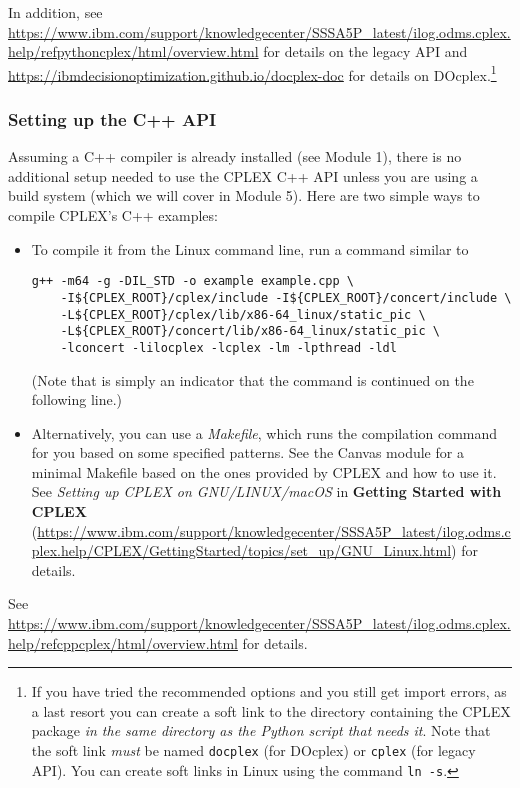 \documentclass[12pt]{article}
\begin{document}
In addition, see \url{https://www.ibm.com/support/knowledgecenter/SSSA5P_latest/ilog.odms.cplex.help/refpythoncplex/html/overview.html} for details on the legacy API and \url{https://ibmdecisionoptimization.github.io/docplex-doc} for details on DOcplex.\footnote{
    If you have tried the recommended options and you still get import errors, as a last resort you can create a soft link to the directory containing the CPLEX package \emph{in the same directory as the Python script that needs it}.
    Note that the soft link \emph{must} be named \texttt{docplex} (for DOcplex) or \texttt{cplex} (for legacy API).
    You can create soft links in Linux using the command \texttt{ln -s}.
}

\subsubsection{Setting up the C++ API}
Assuming a C++ compiler is already installed (see Module 1), there is no additional setup needed to use the CPLEX C++ API unless you are using a build system (which we will cover in Module 5).
Here are two simple ways to compile CPLEX's C++ examples:

\begin{itemize}
    \item To compile it from the Linux command line, run a command similar to
\begin{verbatim}
g++ -m64 -g -DIL_STD -o example example.cpp \
    -I${CPLEX_ROOT}/cplex/include -I${CPLEX_ROOT}/concert/include \
    -L${CPLEX_ROOT}/cplex/lib/x86-64_linux/static_pic \
    -L${CPLEX_ROOT}/concert/lib/x86-64_linux/static_pic \
    -lconcert -lilocplex -lcplex -lm -lpthread -ldl
\end{verbatim}
        (Note that \texttt{\symbol{92}} is simply an indicator that the command is continued on the following line.)
    \item Alternatively, you can use a \emph{Makefile}, which runs the compilation command for you based on some specified patterns.
        See the Canvas module for a minimal Makefile based on the ones provided by CPLEX and how to use it.
        See \textit{Setting up CPLEX on GNU/LINUX/macOS} in \textbf{Getting Started with CPLEX} (\url{https://www.ibm.com/support/knowledgecenter/SSSA5P_latest/ilog.odms.cplex.help/CPLEX/GettingStarted/topics/set_up/GNU_Linux.html}) for details.
\end{itemize}
See \url{https://www.ibm.com/support/knowledgecenter/SSSA5P_latest/ilog.odms.cplex.help/refcppcplex/html/overview.html} for details.
\end{document}
